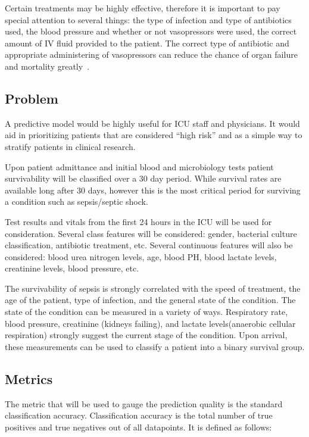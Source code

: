 \documentclass[11pt]{article}
\begin{document}
	Certain treatments may be highly effective, therefore it is important to pay special attention to several things: the type of infection and type of antibiotics used, the blood pressure and whether or not vasopressors were used, the correct amount of IV fluid provided to the patient. The correct type of antibiotic and appropriate administering of vasopressors can reduce the chance of organ failure and mortality greatly~\cite{pressors}.
	
	
	\subsection{Problem}
	
	A predictive model would be highly useful for ICU staff and physicians. It would aid in prioritizing patients that are considered ``high risk'' and as a simple way to stratify patients in clinical research. 
	
	Upon patient admittance and initial blood and microbiology tests patient survivability will be classified over a 30 day period. While survival rates are available long after 30 days, however this is the most critical period for surviving a condition such as sepsis/septic shock. 
	
	Test results and vitals from the first 24 hours in the ICU will be used for consideration. Several class features will be considered: gender, bacterial culture classification, antibiotic treatment, etc. Several continuous features will also be considered: blood urea nitrogen levels, age, blood PH, blood lactate levels, creatinine levels, blood pressure, etc.
	
	The survivability of sepsis is strongly correlated with the speed of treatment, the age of the patient, type of infection, and the general state of the condition. The state of the condition can be measured in a variety of ways. Respiratory rate, blood pressure, creatinine (kidneys failing), and lactate levels(anaerobic cellular respiration) strongly suggest the current stage of the condition. Upon arrival, these measurements can be used to classify a patient into a binary survival group.
	
	\subsection{Metrics}
	The metric that will be used to gauge the prediction quality is the standard classification accuracy. Classification accuracy is the total number of true positives and true negatives out of all datapoints. It is defined as follows:
	
\end{document}

